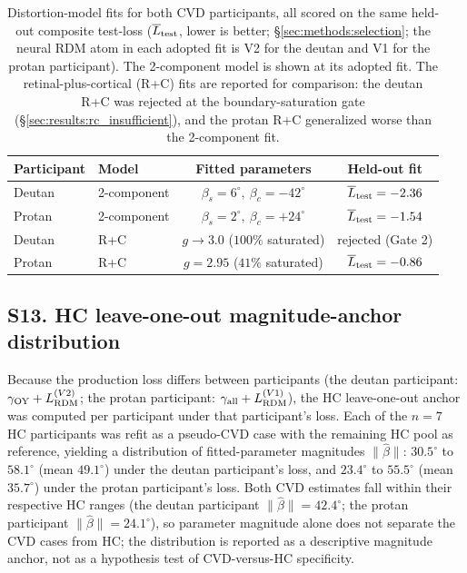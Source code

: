 \begin{table}[ht]
  \caption{Distortion-model fits for both CVD participants, all scored on the same held-out composite test-loss ($\overline{L}_{\rm test}$, lower is better; \S\ref{sec:methods:selection}; the neural RDM atom in each adopted fit is V2 for the deutan and V1 for the protan participant). The 2-component model is shown at its adopted fit. The retinal-plus-cortical (R+C) fits are reported for comparison: the deutan R+C was rejected at the boundary-saturation gate (\S\ref{sec:results:rc_insufficient}), and the protan R+C generalized worse than the 2-component fit.}
  \label{tab:modelfits}
  \centering
  \small
  \begin{tabular}{llcc}
    \toprule Participant & Model & Fitted parameters & Held-out fit \\ \midrule
    Deutan & 2-component & $\beta_s = 6^\circ,\ \beta_c = -42^\circ$ & $\overline{L}_{\rm test} = -2.36$ \\
    Protan & 2-component & $\beta_s = 2^\circ,\ \beta_c = +24^\circ$ & $\overline{L}_{\rm test} = -1.54$ \\ \midrule
    Deutan & R+C & $g \to 3.0$ ($100\%$ saturated) & rejected (Gate 2) \\
    Protan & R+C & $g = 2.95$ ($41\%$ saturated) & $\overline{L}_{\rm test} = -0.86$ \\ \bottomrule
  \end{tabular}
\end{table}


\subsection*{\textbf{S13. HC leave-one-out magnitude-anchor distribution}}
\label{app:hc_perm}

Because the production loss differs between participants (the deutan participant: $\gamma_{\rm OY} + L_{\rm RDM}^{(V2)}$; the protan participant: $\gamma_{\rm all} + L_{\rm RDM}^{(V1)}$), the HC leave-one-out anchor was computed per participant under that participant's loss. Each of the $n = 7$ HC participants was refit as a pseudo-CVD case with the remaining HC pool as reference, yielding a distribution of fitted-parameter magnitudes $\|\hat\beta\|$: $30.5^\circ$ to $58.1^\circ$ (mean $49.1^\circ$) under the deutan participant's loss, and $23.4^\circ$ to $55.5^\circ$ (mean $35.7^\circ$) under the protan participant's loss.
Both CVD estimates fall within their respective HC ranges (the deutan participant $\|\hat\beta\| = 42.4^\circ$; the protan participant $\|\hat\beta\| = 24.1^\circ$), so parameter magnitude alone does not separate the CVD cases from HC; the distribution is reported as a descriptive magnitude anchor, not as a hypothesis test of CVD-versus-HC specificity.

